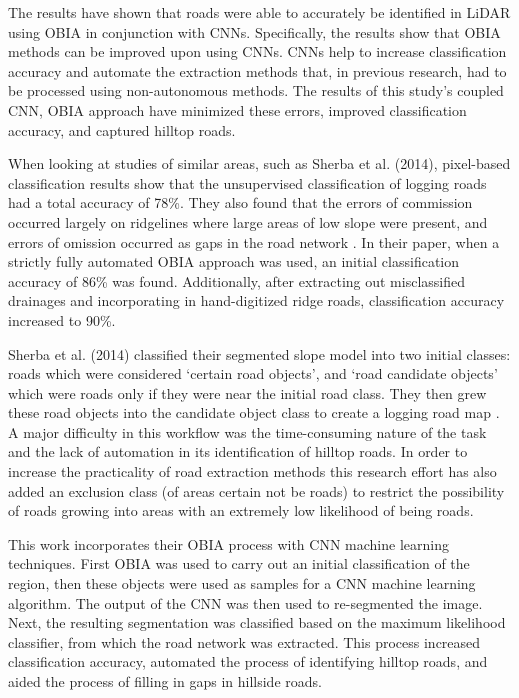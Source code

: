 \documentclass[remotesensing,article,submit,pdftex,moreauthors]{Definitions/mdpi}
\begin{document}
The results have shown that roads were able to accurately be identified in LiDAR using OBIA in conjunction with CNNs. Specifically, the results show that OBIA methods can be improved upon using CNNs. CNNs help to increase classification accuracy and automate the extraction methods that, in previous research, had to be processed using non-autonomous methods. The results of this study’s coupled CNN, OBIA approach have minimized these errors, improved classification accuracy, and captured hilltop roads.

When looking at studies of similar areas, such as Sherba et al. (2014), pixel-based classification results show that the unsupervised classification of logging roads had a total accuracy of 78\%. They also found that the errors of commission occurred largely on ridgelines where large areas of low slope were present, and errors of omission occurred as gaps in the road network \cite{sherba}. In their paper, when a strictly fully automated OBIA approach was used, an initial classification accuracy of 86\% was found. Additionally, after extracting out misclassified drainages and incorporating in hand-digitized ridge roads, classification accuracy increased to 90\%.

Sherba et al. (2014) classified their segmented slope model into two initial classes: roads which were considered ‘certain road objects’, and ‘road candidate objects’ which were roads only if they were near the initial road class. They then grew these road objects into the candidate object class to create a logging road map \cite{sherba}. A major difficulty in this workflow was the time-consuming nature of the task and the lack of automation in its identification of hilltop roads. In order to increase the practicality of road extraction methods this research effort has also added an exclusion class (of areas certain not be roads) to restrict the possibility of roads growing into areas with an extremely low likelihood of being roads.

This work incorporates their OBIA process with CNN machine learning techniques. First OBIA was used to carry out an initial classification of the region, then these objects were used as samples for a CNN machine learning algorithm. The output of the CNN was then used to re-segmented the image. Next, the resulting segmentation was classified based on the maximum likelihood classifier, from which the road network was extracted. This process increased classification accuracy, automated the process of identifying hilltop roads, and aided the process of filling in gaps in hillside roads.
\end{document}
